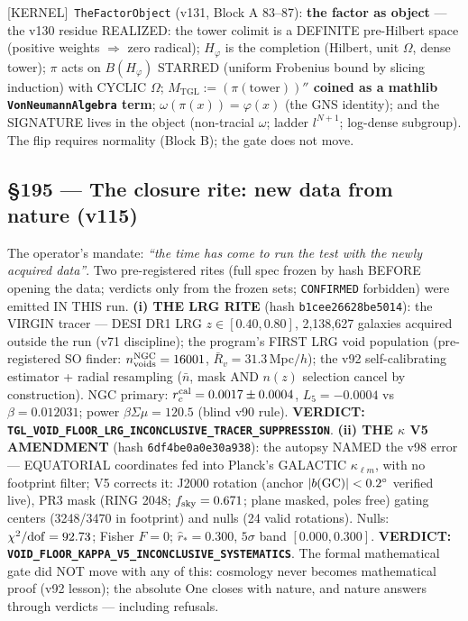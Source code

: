 \documentclass[11pt]{article}
\providecommand{\kernelmk}[1]{\textsf{[KERNEL]}~\texttt{#1}}\providecommand{\knownmk}[1]{\textsf{[KNOWN]}~{#1}}\providecommand{\statusmk}[1]{\textsf{[#1]}}
\theoremstyle{definition}\newtheorem{deriv}{Derivation}
\begin{document}
\kernelmk{TheFactorObject} (v131, Block A 83--87): \textbf{the factor as object} --- the v130 residue REALIZED: the tower colimit is a DEFINITE pre-Hilbert space (positive weights $\Rightarrow$ zero radical); $H_\varphi$ is the completion (Hilbert, unit $\Omega$, dense tower); $\pi$ acts on $B(H_\varphi)$ STARRED (uniform Frobenius bound by slicing induction) with CYCLIC $\Omega$; \textbf{$M_{\mathrm{TGL}}:=(\pi(\mathrm{tower}))''$ coined as a mathlib \texttt{VonNeumannAlgebra} term}; $\omega(\pi(x))=\varphi(x)$ (the GNS identity); and the SIGNATURE lives in the object (non-tracial $\omega$; ladder $l^{N+1}$; log-dense subgroup). The flip requires normality (Block B); the gate does not move.

\subsection*{\S195 --- The closure rite: new data from nature (v115)}The operator's mandate: \emph{``the time has come to run the test with the newly acquired data''}. Two pre-registered rites (full spec frozen by hash BEFORE opening the data; verdicts only from the frozen sets; \texttt{CONFIRMED} forbidden) were emitted IN THIS run. \textbf{(i) THE LRG RITE} (hash \texttt{b1cee26628be5014}): the VIRGIN tracer --- DESI DR1 LRG $z\in[0.40,0.80]$, 2,138,627 galaxies acquired outside the run (v71 discipline); the program's FIRST LRG void population (pre-registered SO finder: $n_{\rm voids}^{\rm NGC}=16001$, $\bar R_v=31.3$\,Mpc$/h$); the v92 self-calibrating estimator + radial resampling ($\bar n$, mask AND $n(z)$ selection cancel by construction). NGC primary: $r_c^{\rm cal}=0.0017\pm0.0004$, $L_5=-0.0004$ vs $\beta=0.012031$; power $\beta\Sigma\mu=120.5$ (blind v90 rule). \textbf{VERDICT: \texttt{TGL\_VOID\_FLOOR\_LRG\_INCONCLUSIVE\_TRACER\_SUPPRESSION}}. \textbf{(ii) THE $\kappa$ V5 AMENDMENT} (hash \texttt{6df4be0a0e30a938}): the autopsy NAMED the v98 error --- EQUATORIAL coordinates fed into Planck's GALACTIC $\kappa_{\ell m}$, with no footprint filter; V5 corrects it: J2000 rotation (anchor $|b({\rm GC})|<0.2^\circ$ verified live), PR3 mask (RING 2048; $f_{\rm sky}=0.671$; plane masked, poles free) gating centers (3248/3470 in footprint) and nulls (24 valid rotations). Nulls: $\chi^2/{\rm dof}=92.73$; Fisher $F=0$; $\hat r_*=0.300$, $5\sigma$ band $[0.000,0.300]$. \textbf{VERDICT: \texttt{VOID\_FLOOR\_KAPPA\_V5\_INCONCLUSIVE\_SYSTEMATICS}}. The formal mathematical gate did NOT move with any of this: cosmology never becomes mathematical proof (v92 lesson); the absolute One closes with nature, and nature answers through verdicts --- including refusals.
\end{document}

